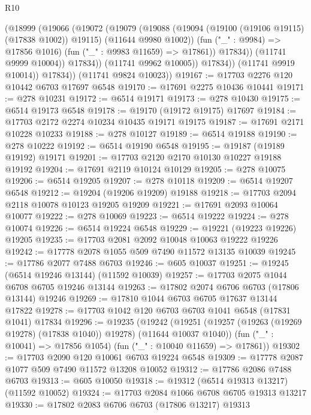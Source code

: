 \begin{lexlean}{R10}
\begin{coremodule}
                      (@18999
                        (@19066
                          (@19072
                            (@19079
                              (@19088
                                (@19094 (@19100 (@19106 @19115) (@17838 @1002)) @19115)
                                (@11644 @9980 @1002))
                              (fun ("_" : @9984) => @17856 @1016)
                              (fun ("_" : @9983 @11659) => @17861))
                            @17834))
                        (@11741 @9999 @10004))
                      @17834))
                  (@11741 @9962 @10005))
                @17834))
            (@11741 @9919 @10014))
          @17834))
      (@11741 @9824 @10023))
@19167 := @17703 @2276 @120 @10442 @6703 @17697 @6548
@19170 := @17691 @2275 @10436 @10441
@19171 := @278 @10231
@19172 := @6514 @19171
@19173 := @278 @10430
@19175 := @6514 @19173 @6548
@19178 := @19170 (@19172 @19175) @17697
@19184 := @17703 @2172 @2274 @10234 @10435 @19171 @19175
@19187 := @17691 @2171 @10228 @10233
@19188 := @278 @10127
@19189 := @6514 @19188
@19190 := @278 @10222
@19192 := @6514 @19190 @6548
@19195 := @19187 (@19189 @19192) @19171
@19201 := @17703 @2120 @2170 @10130 @10227 @19188 @19192
@19204 := @17691 @2119 @10124 @10129
@19205 := @278 @10075
@19206 := @6514 @19205
@19207 := @278 @10118
@19209 := @6514 @19207 @6548
@19212 := @19204 (@19206 @19209) @19188
@19218 := @17703 @2094 @2118 @10078 @10123 @19205 @19209
@19221 := @17691 @2093 @10064 @10077
@19222 := @278 @10069
@19223 := @6514 @19222
@19224 := @278 @10074
@19226 := @6514 @19224 @6548
@19229 := @19221 (@19223 @19226) @19205
@19235 := @17703 @2081 @2092 @10048 @10063 @19222 @19226
@19242 := @17778 @2078 @1055 @509 @7490 @11572 @13135 @10039
@19245 := @17786 @2077 @7488 @6703
@19246 := @605 @10037
@19251 := @19245 (@6514 @19246 @13144) (@11592 @10039)
@19257 := @17703 @2075 @1044 @6708 @6705 @19246 @13144
@19263 := @17802 @2074 @6706 @6703 (@17806 @13144) @19246
@19269 := @17810 @1044 @6703 @6705 @17637 @13144 @17822
@19278 := @17703 @1042 @120 @6703 @6703 @1041 @6548 (@17831 @1041) @17834
@19296 := @19235
    (@19242
      (@19251 (@19257 (@19263 (@19269 @19278) (@17838 @1040)) @19278) (@11644 @10037 @1040))
      (fun ("_" : @10041) => @17856 @1054)
      (fun ("_" : @10040 @11659) => @17861))
@19302 := @17703 @2090 @120 @10061 @6703 @19224 @6548
@19309 := @17778 @2087 @1077 @509 @7490 @11572 @13208 @10052
@19312 := @17786 @2086 @7488 @6703
@19313 := @605 @10050
@19318 := @19312 (@6514 @19313 @13217) (@11592 @10052)
@19324 := @17703 @2084 @1066 @6708 @6705 @19313 @13217
@19330 := @17802 @2083 @6706 @6703 (@17806 @13217) @19313

\end{coremodule}
\end{lexlean}
